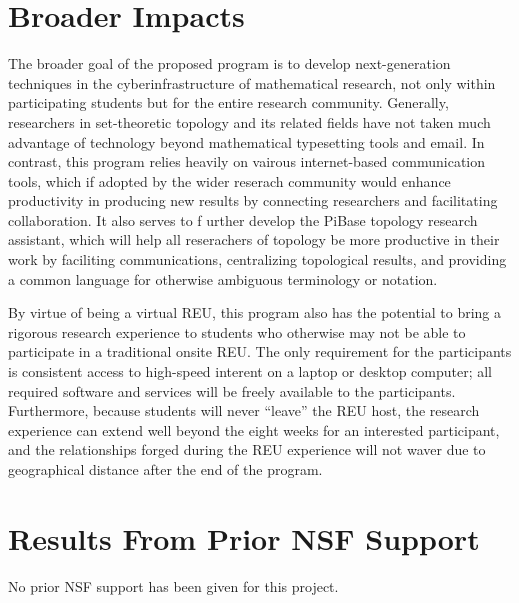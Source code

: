 \section{Broader Impacts}

  The broader goal of the proposed program is to develop next-generation
  techniques in the cyberinfrastructure of mathematical research,
  not only within participating students but for the entire research
  community. Generally, researchers in set-theoretic topology
  and its related fields have not
  taken much advantage of technology beyond mathematical typesetting tools
  and email. In contrast, this program relies heavily on vairous internet-based
  communication tools, which if adopted by the wider
  reserach community would enhance productivity in producing new results
  by connecting researchers and facilitating collaboration. It also serves to f
  urther develop the PiBase topology research assistant, which will help all
  reserachers of topology be more productive in their work by faciliting
  communications, centralizing topological results, and providing a common
  language for otherwise ambiguous terminology or notation.

  By virtue of being a virtual REU, this program also has the potential to
  bring a rigorous research experience to students who otherwise may not
  be able to participate in a traditional onsite REU. The only requirement
  for the participants is consistent access to high-speed interent on a
  laptop or desktop computer; all required software and services will
  be freely available to the participants. Furthermore, because students
  will never ``leave'' the REU host, the research experience can extend
  well beyond the eight weeks for an interested participant, and the
  relationships forged during the REU experience will not waver due to
  geographical distance after the end of the program.

\section{Results From Prior NSF Support}

  No prior NSF support has been given for this project.
